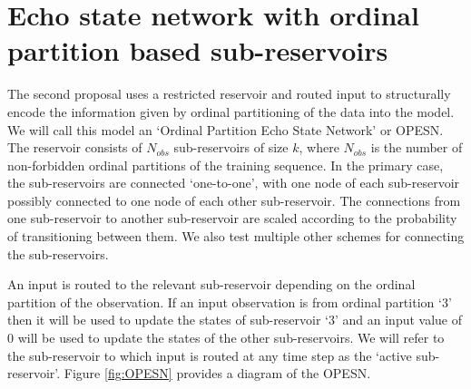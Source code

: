 
\renewcommand{\chapterlabel}{Chapter}
\chapter{Echo state network with ordinal partition based sub-reservoirs}
\label{chap:OPESNs}


The second proposal uses a restricted reservoir and routed input to structurally encode the information given by ordinal partitioning of the data into the model. We will call this model an `Ordinal Partition Echo State Network' or OPESN. The reservoir consists of $N_{obs}$ sub-reservoirs of size $k$, where $N_{obs}$ is the number of non-forbidden ordinal partitions of the training sequence. In the primary case, the sub-reservoirs are connected `one-to-one', with one node of each sub-reservoir possibly connected to one node of each other sub-reservoir. The connections from one sub-reservoir to another sub-reservoir are scaled according to the probability of transitioning between them. We also test multiple other schemes for connecting the sub-reservoirs.

An input is routed to the relevant sub-reservoir depending on the ordinal partition of the observation. If an input observation is from ordinal partition `3' then it will be used to update the states of sub-reservoir `3' and an input value of 0 will be used to update the states of the other sub-reservoirs. We will refer to the sub-reservoir to which input is routed at any time step as the `active sub-reservoir'. Figure \ref{fig:OPESN} provides a diagram of the OPESN.

